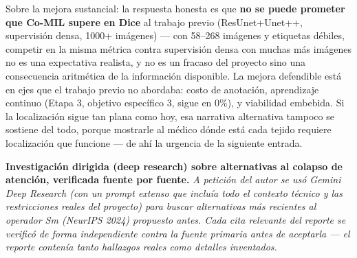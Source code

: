 \documentclass[12pt,letterpaper]{report}
\newcommand{\entrada}[2]{%
    \vspace{0.6em}
    \noindent\textbf{#1.} \textit{#2}
    \vspace{0.3em}
    \par
}
\begin{document}
Sobre la mejora sustancial: la respuesta honesta es que \textbf{no se puede prometer que Co-MIL supere
en Dice} al trabajo previo (ResUnet+Unet++, supervisión densa, 1000+ imágenes) --- con 58--268
imágenes y etiquetas débiles, competir en la misma métrica contra supervisión densa con muchas más
imágenes no es una expectativa realista, y no es un fracaso del proyecto sino una consecuencia
aritmética de la información disponible. La mejora defendible está en ejes que el trabajo previo no
abordaba: costo de anotación, aprendizaje continuo (Etapa 3, objetivo específico 3, sigue en 0\%), y
viabilidad embebida. Si la localización sigue tan plana como hoy, esa narrativa alternativa tampoco
se sostiene del todo, porque mostrarle al médico dónde está cada tejido requiere localización que
funcione --- de ahí la urgencia de la siguiente entrada.

\entrada{Investigación dirigida (deep research) sobre alternativas al colapso de atención, verificada
fuente por fuente}{A petición del autor se usó Gemini Deep Research (con un prompt extenso que incluía
todo el contexto técnico y las restricciones reales del proyecto) para buscar alternativas más
recientes al operador Sm (NeurIPS 2024) propuesto antes. Cada cita relevante del reporte se verificó
de forma independiente contra la fuente primaria antes de aceptarla --- el reporte contenía tanto
hallazgos reales como detalles inventados.}
\end{document}
